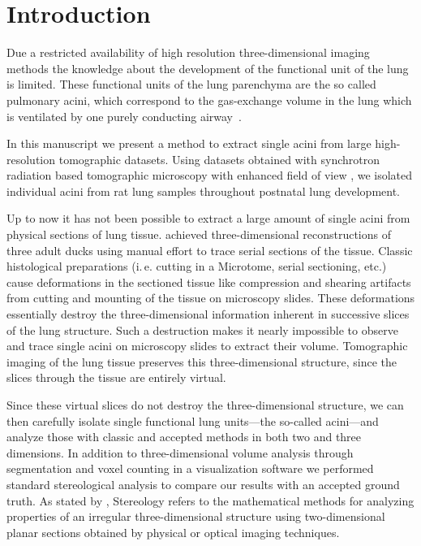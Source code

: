 \documentclass[%
	paper=a4,%
	abstract=true,%
	]{scrartcl}
\newcommand{\ie}{i.\,e.\xspace}
\begin{document}
\clearpage
{}
\tableofcontents

\clearpage
\section{Introduction}
Due a restricted availability of high resolution three-dimensional imaging methods the knowledge about the development of the functional unit of the lung is limited. These functional units of the lung parenchyma are the so called pulmonary acini, which correspond to the gas-exchange volume in the lung which is ventilated by one purely conducting airway~\cite{Rodriguez1987}.

In this manuscript we present a method to extract single acini from large high-resolution tomographic datasets. Using datasets obtained with synchrotron radiation based tomographic microscopy with enhanced field of view \cite{Haberthuer2010a}, we isolated individual acini from rat lung samples throughout postnatal lung development. 

Up to now it has not been possible to extract a large amount of single acini from physical sections of lung tissue. \citet{Woodward2005} achieved three-dimensional reconstructions of three adult ducks using manual effort to trace serial sections of the tissue. Classic histological preparations (\ie cutting in a Microtome, serial sectioning, etc.) cause deformations in the sectioned tissue like compression and shearing artifacts from cutting and mounting of the tissue on microscopy slides. These deformations essentially destroy the three-dimensional information inherent in successive slices of the lung structure. Such a destruction makes it nearly impossible to observe and trace single acini on microscopy slides to extract their volume. Tomographic imaging of the lung tissue preserves this three-dimensional structure, since the slices through the tissue are entirely virtual.

Since these virtual slices do not destroy the three-dimensional structure, we can then carefully isolate single functional lung units---the so-called acini---and analyze those with classic and accepted methods in both two and three dimensions. In addition to three-dimensional volume analysis through segmentation and voxel counting in a visualization software we performed standard stereological analysis \cite{Hsia2010} to compare our results with an accepted ground truth. As stated by \citet{Hsia2010}, Stereology refers to the mathematical methods for analyzing properties of an irregular three-dimensional structure using two-dimensional planar sections obtained by physical or optical imaging techniques.
\end{document}
